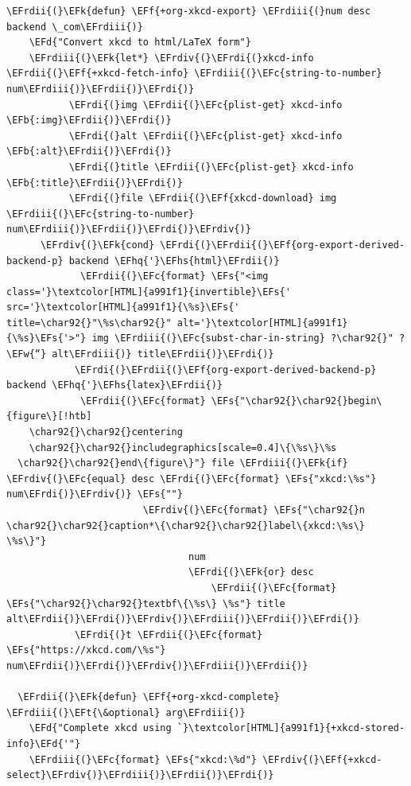 \documentclass{scrartcl}
\newcommand{\EFk}[1]{\textcolor{EFk}{#1}} %
\newcommand{\EFd}[1]{\textcolor{EFd}{#1}} %
\newcommand{\EFt}[1]{\textcolor{EFt}{#1}} %
\newcommand{\EFs}[1]{\textcolor{EFs}{#1}} %
\newcommand{\EFw}[1]{\textcolor{EFw}{#1}} %
\newcommand{\EFb}[1]{\textcolor{EFb}{#1}} %
\newcommand{\EFc}[1]{\textcolor{EFc}{#1}} %
\newcommand{\EFf}[1]{\textcolor{EFf}{#1}} %
\newcommand{\EFhq}[1]{#1} %
\newcommand{\EFhs}[1]{#1} %
\newcommand{\EFrdi}[1]{#1} %
\newcommand{\EFrdii}[1]{#1} %
\newcommand{\EFrdiii}[1]{#1} %
\newcommand{\EFrdiv}[1]{#1} %
\begin{document}
\begin{Code}
\begin{Verbatim}[]
  \EFrdii{(}\EFk{defun} \EFf{+org-xkcd-export} \EFrdiii{(}num desc backend \_com\EFrdiii{)}
    \EFd{"Convert xkcd to html/LaTeX form"}
    \EFrdiii{(}\EFk{let*} \EFrdiv{(}\EFrdi{(}xkcd-info \EFrdii{(}\EFf{+xkcd-fetch-info} \EFrdiii{(}\EFc{string-to-number} num\EFrdiii{)}\EFrdii{)}\EFrdi{)}
           \EFrdi{(}img \EFrdii{(}\EFc{plist-get} xkcd-info \EFb{:img}\EFrdii{)}\EFrdi{)}
           \EFrdi{(}alt \EFrdii{(}\EFc{plist-get} xkcd-info \EFb{:alt}\EFrdii{)}\EFrdi{)}
           \EFrdi{(}title \EFrdii{(}\EFc{plist-get} xkcd-info \EFb{:title}\EFrdii{)}\EFrdi{)}
           \EFrdi{(}file \EFrdii{(}\EFf{xkcd-download} img \EFrdiii{(}\EFc{string-to-number} num\EFrdiii{)}\EFrdii{)}\EFrdi{)}\EFrdiv{)}
      \EFrdiv{(}\EFk{cond} \EFrdi{(}\EFrdii{(}\EFf{org-export-derived-backend-p} backend \EFhq{'}\EFhs{html}\EFrdii{)}
             \EFrdii{(}\EFc{format} \EFs{"<img class='}\textcolor[HTML]{a991f1}{invertible}\EFs{' src='}\textcolor[HTML]{a991f1}{\%s}\EFs{' title=\char92{}"\%s\char92{}" alt='}\textcolor[HTML]{a991f1}{\%s}\EFs{'>"} img \EFrdiii{(}\EFc{subst-char-in-string} ?\char92{}" ?\EFw{“} alt\EFrdiii{)} title\EFrdii{)}\EFrdi{)}
            \EFrdi{(}\EFrdii{(}\EFf{org-export-derived-backend-p} backend \EFhq{'}\EFhs{latex}\EFrdii{)}
             \EFrdii{(}\EFc{format} \EFs{"\char92{}\char92{}begin\{figure\}[!htb]
    \char92{}\char92{}centering
    \char92{}\char92{}includegraphics[scale=0.4]\{\%s\}\%s
  \char92{}\char92{}end\{figure\}"} file \EFrdiii{(}\EFk{if} \EFrdiv{(}\EFc{equal} desc \EFrdi{(}\EFc{format} \EFs{"xkcd:\%s"} num\EFrdi{)}\EFrdiv{)} \EFs{""}
                        \EFrdiv{(}\EFc{format} \EFs{"\char92{}n  \char92{}\char92{}caption*\{\char92{}\char92{}label\{xkcd:\%s\} \%s\}"}
                                num
                                \EFrdi{(}\EFk{or} desc
                                    \EFrdii{(}\EFc{format} \EFs{"\char92{}\char92{}textbf\{\%s\} \%s"} title alt\EFrdii{)}\EFrdi{)}\EFrdiv{)}\EFrdiii{)}\EFrdii{)}\EFrdi{)}
            \EFrdi{(}t \EFrdii{(}\EFc{format} \EFs{"https://xkcd.com/\%s"} num\EFrdii{)}\EFrdi{)}\EFrdiv{)}\EFrdiii{)}\EFrdii{)}

  \EFrdii{(}\EFk{defun} \EFf{+org-xkcd-complete} \EFrdiii{(}\EFt{\&optional} arg\EFrdiii{)}
    \EFd{"Complete xkcd using `}\textcolor[HTML]{a991f1}{+xkcd-stored-info}\EFd{'"}
    \EFrdiii{(}\EFc{format} \EFs{"xkcd:\%d"} \EFrdiv{(}\EFf{+xkcd-select}\EFrdiv{)}\EFrdiii{)}\EFrdii{)}\EFrdi{)}
\end{Verbatim}
\end{Code}
\end{document}
